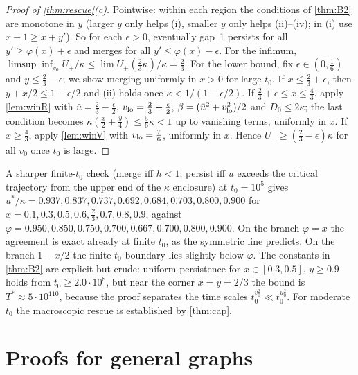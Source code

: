 \begin{proof}[Proof of \cref{thm:rescue}(c)]
Pointwise: within each region the conditions of \cref{thm:B2} are monotone in $y$ (larger $y$ only helps (i), smaller $y$ only helps
(ii)--(iv); in (i) use $x+1\ge x+y'$). So for each $\epsilon>0$, eventually gap~1 persists for all $y'\ge\varphi(x)+\epsilon$ and merges for all
$y'\le\varphi(x)-\epsilon$. For the infimum, $\limsup\inf_{v_0}U_+/\kappa\le\lim U_+(\frac23\kappa)/\kappa=\frac23$. For the lower bound, fix
$\epsilon\in(0,\frac16)$ and $y\le\frac23-\epsilon$; we show merging uniformly in $x>0$ for large $t_0$. If $x\le\frac23+\epsilon$, then $y+x/2\le1-\epsilon/2$
and (ii) holds once $\bar\kappa<1/(1-\epsilon/2)$. If $\frac23+\epsilon\le x\le\frac43$, apply \cref{lem:winR} with $\bar u=\frac23-\frac\epsilon2$,
$v_{\rm lo}=\frac23+\frac\epsilon2$, $\beta=(\bar u^2+v_{\rm lo}^2)/2$ and $D_0\le2\kappa$; the last condition becomes
$\bar\kappa(\frac x2+\frac y4)\le\frac56\bar\kappa<1$ up to vanishing terms, uniformly in $x$. If $x\ge\frac43$, apply \cref{lem:winV} with
$v_{\rm lo}=\frac76$, uniformly in $x$. Hence $U_-\ge(\frac23-\epsilon)\kappa$ for all $v_0$ once $t_0$ is large.
\end{proof}

\begin{remark}
A sharper finite-$t_0$ check (merge iff $h<1$; persist iff $u$ exceeds the critical trajectory from the upper end of the $\kappa$ enclosure) at
$t_0=10^5$ gives $u^*/\kappa=0.937,0.837,0.737,0.692,0.684,0.703,0.800,0.900$ for $x=0.1,0.3,0.5,0.6,\frac23,0.7,0.8,0.9$, against
$\varphi=0.950,0.850,0.750,0.700,0.667,0.700,0.800,0.900$. On the branch $\varphi=x$ the agreement is exact already at finite $t_0$, as the
symmetric line predicts. On the branch $1-x/2$ the finite-$t_0$ boundary lies slightly below $\varphi$. The constants in \cref{thm:B2} are
explicit but crude: uniform persistence for $x\in[0.3,0.5]$, $y\ge0.9$ holds from $t_0\ge2.0\cdot10^8$, but near the corner $x=y=2/3$ the bound
is $T^*\approx5\cdot10^{110}$, because the proof separates the time scales $t_0^{v_0^2}\ll t_0^{u_0^2}$. For moderate $t_0$ the macroscopic
rescue is established by \cref{thm:cap}.
\end{remark}

\section{Proofs for general graphs}\label{app:graphs}

